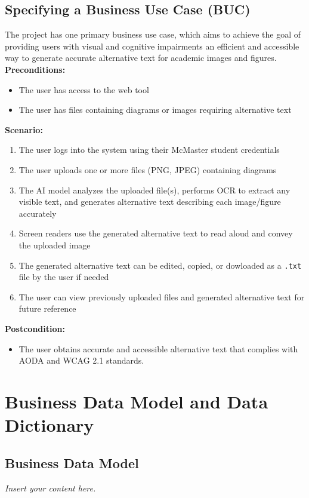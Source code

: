 \documentclass[12pt]{article}
\newcommand{\lips}{\textit{Insert your content here.}}
\begin{document}
\subsection{Specifying a Business Use Case (BUC)}
The project has one primary business use case, which aims to achieve
the goal of providing users with visual and cognitive impairments an efficient
and accessible way to generate accurate alternative text for academic
images and figures.\\[1ex]
\textbf{Preconditions:}
\begin{itemize}
  \item The user has access to the web tool
  \item The user has files containing diagrams or images requiring
    alternative text
\end{itemize}
\textbf{Scenario:}
\begin{enumerate}
  \item The user logs into the system using their McMaster student credentials
  \item The user uploads one or more files (PNG, JPEG) containing diagrams
  \item The AI model analyzes the uploaded file(s), performs OCR to
    extract any visible text, and generates
    alternative text describing each image/figure accurately
  \item Screen readers use the generated alternative text to read
    aloud and convey the uploaded image
  \item The generated alternative text can be edited, copied, or
    dowloaded as a \texttt{.txt} file by the user if needed
  \item The user can view previously uploaded files and generated
    alternative text for future reference
\end{enumerate}
\textbf{Postcondition:}
\begin{itemize}
  \item The user obtains accurate and accessible alternative text
    that complies with AODA and WCAG 2.1 standards.
\end{itemize}

\section{Business Data Model and Data Dictionary}
\subsection{Business Data Model}
\lips
\end{document}
